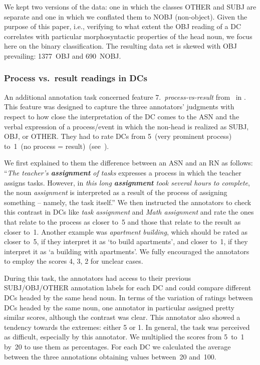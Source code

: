 \documentclass[output=paper]{langsci/langscibook}
\begin{document}
We kept two versions of the data: one in which  {the classes} OTHER and SUBJ are separate and one in which we conflated them to NOBJ (non-object). Given the purpose of this paper, i.e., verifying to what extent the OBJ reading of a DC correlates with particular morphosyntactic properties of the head noun, we focus here on the binary classification. The resulting data set is skewed with OBJ prevailing: 1377~OBJ and 690~NOBJ.

\subsubsection{Process vs.\ result readings in DCs}\label{sec:annotation:p-r}
An additional annotation task concerned feature 7.~\textit{process-vs-result} from~ in  {. This feature} was designed to capture the three annotators' judgments with respect to how close the interpretation of the DC comes to the ASN and the verbal expression of a process/event in which the non-head is realized as SUBJ, OBJ, or OTHER.
They had to rate DCs from 5~(very prominent process) to~1~(no process = result)~(see~\cite{grimshaw:90}). 

We first explained to them the difference between an ASN and an RN as follows: ``\textit{The teacher's \textbf{assignment} of tasks} expresses a process in which the teacher assigns tasks.
However, in \textit{this long \textbf{assignment} took several hours to complete}, the noun \textit{assignment} is interpreted as a result of the process of assigning something -- namely, the task itself.''
We then instructed the annotators to check this contrast in DCs like \textit{task assignment} and \textit{Math assignment} and rate the ones that relate to the process as closer to~5 and those that relate to the result as closer to~1. Another example was \textit{apartment building}, which should be rated as closer to~5, if they interpret it as \lq to build apartments\rq, and closer to~1, if they  interpret it as \lq a building with apartments\rq. We fully encouraged the annotators to employ the scores 4, 3, 2 for unclear cases. 
 
During this task, the annotators had access to their previous  {SUBJ/OBJ/OTHER annotation} labels  for each DC and could compare different DCs headed by the same head noun. In terms of the variation of ratings between DCs headed by the same noun, one annotator in particular assigned pretty similar scores, although the contrast was clear. This annotator also showed a  tendency towards the extremes: either 5 or 1. In general, the task was perceived as difficult, especially by this annotator. We multiplied the scores from 5~to~1 by~20 to use them as percentages. For each DC we calculated the average between the three annotations obtaining values between~20 and~100. 
 
\end{document}
